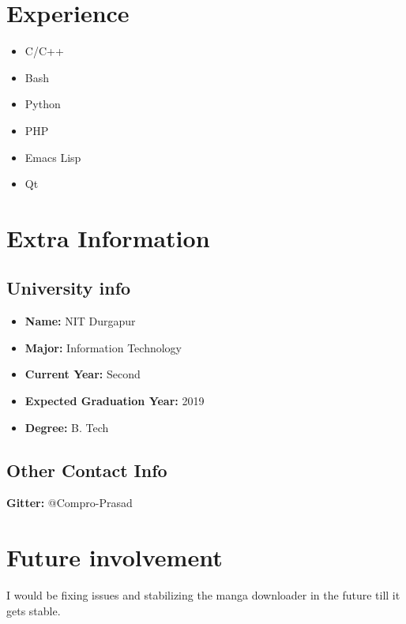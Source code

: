 \documentclass[11pt]{article}
\begin{document}
\section{Experience}
\label{sec:orgeb1fbc5}
\begin{itemize}
\item C/C++
\item Bash
\item Python
\item PHP
\item Emacs Lisp
\item Qt
\end{itemize}

\section{Extra Information}
\label{sec:org800fe6f}

\subsection{University info}
\label{sec:org315877f}
\begin{itemize}
\item \textbf{Name:} NIT Durgapur
\item \textbf{Major:} Information Technology
\item \textbf{Current Year:} Second
\item \textbf{Expected Graduation Year:} 2019
\item \textbf{Degree:} B. Tech
\end{itemize}

\subsection{Other Contact Info}
\label{sec:org8661524}
\textbf{Gitter:} @Compro-Prasad

\section{Future involvement}
\label{sec:org32b3ebc}
I would be fixing issues and stabilizing the manga downloader in the future
till it gets stable.
\end{document}
